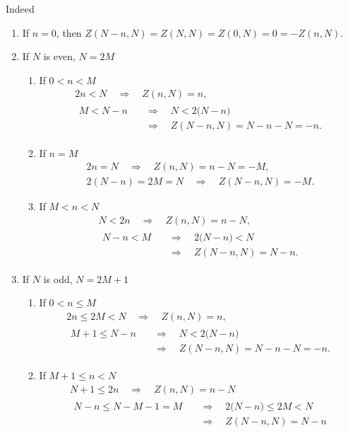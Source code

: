 \documentclass[draft, appendixprefix=true, chapterprefix=true, fontsize=12pt, numbers=noendperiod]{scrbook}
\begin{document}
\small
Indeed
\begin{enumerate}
  \setlength{\itemsep}{0pt}
\item If \(n=0\), then \(Z(N-n, N)=Z(N, N)=Z(0, N)=0=-Z(n, N)\).
\item If \(N\) is even, \(N=2M\)
  \begin{enumerate}
    \setlength{\itemsep}{0pt}
  \item If \(0<n<M\)
    \begin{gather*}
      2n<N\quad\Rightarrow\quad Z(n, N)=n,\\
      \begin{aligned}
        M<N-n&\quad\Rightarrow\quad N<2\bigl(N-n\bigr)\\
        &\quad\Rightarrow\quad Z(N-n, N)=N-n-N=-n.
      \end{aligned}
    \end{gather*}
  \item If \(n=M\)
    \begin{gather*}
      2n=N\quad\Rightarrow\quad Z(n, N)=n-N=-M,\\
      2(N-n)=2M=N\quad\Rightarrow\quad Z(N-n, N)=-M.
    \end{gather*}
  \item If \(M<n<N\)
    \begin{gather*}
      N<2n\quad\Rightarrow\quad Z(n, N)=n-N,\\
      \begin{aligned}
        N-n<M&\quad\Rightarrow\quad 2\bigl(N-n\bigr)<N\\
        &\quad\Rightarrow\quad Z(N-n, N)=N-n.
   \end{aligned}
    \end{gather*}
  \end{enumerate}
\item If \(N\) is odd, \(N=2M+1\)
  \begin{enumerate}
    \setlength{\itemsep}{0pt}
  \item If \(0<n\leq M\)
    \begin{gather*}
      2n\leq 2M<N\quad\Rightarrow\quad Z(n, N)=n,\\
      \begin{aligned}
        M+1\leq N-n&\quad\Rightarrow\quad N<2\bigl(N-n\bigr)\\
        &\quad\Rightarrow\quad Z(N-n, N)=N-n-N=-n.
    \end{aligned}
    \end{gather*}
  \item If \(M+1\leq n<N\)
    \begin{gather*}
      N+1\leq 2n\quad\Rightarrow\quad Z(n, N)=n-N\\
      \begin{aligned}
        N-n\leq N-M-1=M&\quad\Rightarrow\quad 2\bigl(N-n\bigr)\leq 2M<N\\
        &\quad\Rightarrow\quad Z(N-n, N)=N-n
    \end{aligned}
    \end{gather*}
  \end{enumerate}
\end{enumerate}
\normalsize
\end{document}
